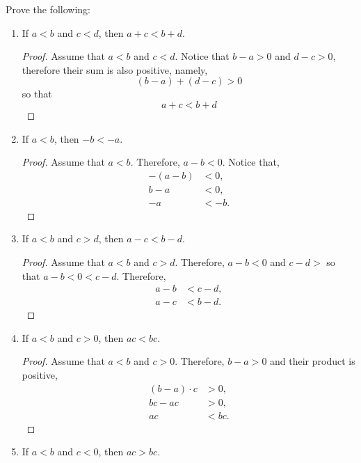 \begin{exercise}[\textbf{5}] Prove the following:
     \begin{enumerate}
         \item If $a<b$ and $c<d$, then $a+c<b+d$.
         \begin{proof} Assume that $a<b$ and $c<d$. Notice that $b-a>0$ and
         $d-c>0$, therefore their sum is also positive, namely,
              \begin{equation*}
                  (b-a)+(d-c)>0
              \end{equation*}
            so that 
            \begin{equation*}
                a+c < b+d
            \end{equation*}
         \end{proof}
         \item If $a<b$, then $-b<-a$.
         \begin{proof} Assume that $a<b$. Therefore, $a-b<0$. Notice that,
            \begin{align*}
                -(a-b)&<0, \\
                b-a&<0, \\
                -a &< -b.                
            \end{align*}              
         \end{proof}
         \item If $a<b$ and $c>d$, then $a-c<b-d$.
         \begin{proof}Assume that $a<b$ and $c>d$. Therefore, $a-b<0$ and $c-d>$
         so that $a-b<0<c-d$. Therefore,
              \begin{align*}
                a-b&<c-d, \\
                a-c &<b-d.
              \end{align*}
         \end{proof}
         \item If $a<b$ and $c>0$, then $ac<bc$.
         \begin{proof} Assume that $a<b$ and $c>0$. Therefore, $b-a>0$ and their
         product is positive,
              \begin{align*}
                  (b-a)\cdot c&>0, \\
                  bc-ac &> 0, \\
                  ac &< bc.
              \end{align*}
         \end{proof}
         \item If $a<b$ and $c<0$, then $ac>bc$.

\end{enumerate}
\end{exercise}
